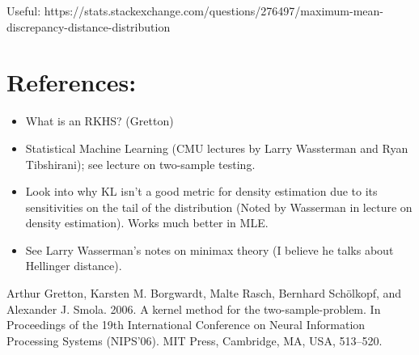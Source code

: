 \documentclass[12pt]{article}
\begin{document}
Useful: https://stats.stackexchange.com/questions/276497/maximum-mean-discrepancy-distance-distribution

\section{References:}
\begin{itemize}
\item What is an RKHS? (Gretton)
\item Statistical Machine Learning (CMU lectures by Larry Wassterman and Ryan Tibshirani); see lecture on two-sample testing. 
\item Look into why KL isn't a good metric for density estimation due to its sensitivities on the tail of the distribution (Noted by Wasserman in lecture on density estimation). Works much better in MLE. 
\item See Larry Wasserman's notes on minimax theory (I believe he talks about Hellinger distance).  
\end{itemize}

\begin{thebibliography}{20}
 Arthur Gretton, Karsten M. Borgwardt, Malte Rasch, Bernhard Schölkopf, and Alexander J. Smola. 2006. A kernel method for the two-sample-problem. In Proceedings of the 19th International Conference on Neural Information Processing Systems (NIPS'06). MIT Press, Cambridge, MA, USA, 513–520.
\end{thebibliography}
\end{document}
